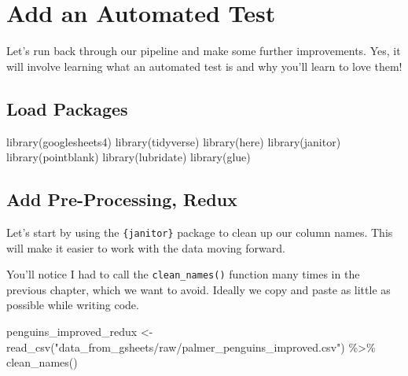 \documentclass[
  letterpaper,
  DIV=11,
  numbers=noendperiod]{scrreprt}
\newenvironment{Shaded}{\begin{snugshade}}{\end{snugshade}}
\newcommand{\FunctionTok}[1]{\textcolor[rgb]{0.28,0.35,0.67}{#1}}
\newcommand{\NormalTok}[1]{\textcolor[rgb]{0.00,0.23,0.31}{#1}}
\newcommand{\OtherTok}[1]{\textcolor[rgb]{0.00,0.23,0.31}{#1}}
\newcommand{\SpecialCharTok}[1]{\textcolor[rgb]{0.37,0.37,0.37}{#1}}
\newcommand{\StringTok}[1]{\textcolor[rgb]{0.13,0.47,0.30}{#1}}
\begin{document}

\hypertarget{add-an-automated-test}{%
\chapter{Add an Automated Test}\label{add-an-automated-test}}

Let's run back through our pipeline and make some further improvements.
Yes, it will involve learning what an automated test is and why you'll
learn to love them!

\hypertarget{load-packages-1}{%
\section{Load Packages}\label{load-packages-1}}

\begin{Shaded}
\begin{Highlighting}[]
\FunctionTok{library}\NormalTok{(googlesheets4)}
\FunctionTok{library}\NormalTok{(tidyverse)}
\FunctionTok{library}\NormalTok{(here)}
\FunctionTok{library}\NormalTok{(janitor)}
\FunctionTok{library}\NormalTok{(pointblank)}
\FunctionTok{library}\NormalTok{(lubridate)}
\FunctionTok{library}\NormalTok{(glue)}
\end{Highlighting}
\end{Shaded}

\hypertarget{add-pre-processing-redux}{%
\section{Add Pre-Processing, Redux}\label{add-pre-processing-redux}}

Let's start by using the \texttt{\{janitor\}} package to clean up our
column names. This will make it easier to work with the data moving
forward.

You'll notice I had to call the \texttt{clean\_names()} function many
times in the previous chapter, which we want to avoid. Ideally we copy
and paste as little as possible while writing code.

\begin{Shaded}
\begin{Highlighting}[]
\NormalTok{penguins\_improved\_redux }\OtherTok{\textless{}{-}} 
  \FunctionTok{read\_csv}\NormalTok{(}\StringTok{"data\_from\_gsheets/raw/palmer\_penguins\_improved.csv"}\NormalTok{) }\SpecialCharTok{\%\textgreater{}\%} 
  \FunctionTok{clean\_names}\NormalTok{()}
\end{Highlighting}
\end{Shaded}
\end{document}
